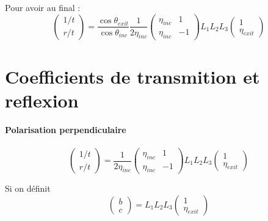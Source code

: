 \documentclass[a4paper,english]{article}
\begin{document}
Pour avoir au final :
\begin{dmath}
\begin{pmatrix}1/t \\ r/t \end{pmatrix} = \frac{\cos \theta_{exit}}{\cos \theta_{inc}} \frac{1}{2 \eta_{inc}} \begin{pmatrix} \eta_{inc} & 1 \\ \eta_{inc} & -1 \end{pmatrix} L_1 L_2 L_3 \begin{pmatrix} 1 \\ \eta_{exit} \end{pmatrix}
\end{dmath}














\section{Coefficients de transmition et reflexion}
\paragraph{Polarisation perpendiculaire}

\begin{dmath}
\begin{pmatrix}1/t \\ r/t \end{pmatrix} = \frac{1}{2 \eta_{inc}} \begin{pmatrix} \eta_{inc} & 1 \\ \eta_{inc} & -1 \end{pmatrix} L_1 L_2 L_3 \begin{pmatrix} 1 \\ \eta_{exit} \end{pmatrix}
\end{dmath}

Si on définit
\begin{dmath}
\begin{pmatrix} b \\ c \end{pmatrix} = L_1 L_2 L_3 \begin{pmatrix} 1 \\ \eta_{exit} \end{pmatrix}
\end{dmath}
\end{document}
